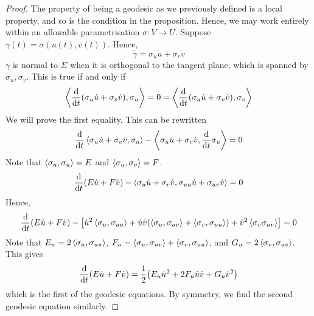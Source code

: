 \documentclass[a4paper]{article}
\begin{document}
\begin{proof}
	The property of being a geodesic as we previously defined is a local property, and so is the condition in the proposition.
	Hence, we may work entirely within an allowable parametrisation \( \sigma \colon V \to U \).
	Suppose \( \gamma(t) = \sigma(u(t), v(t)) \).
	Hence,
	\[
		\dot \gamma = \sigma_u \dot u + \sigma_v \dot v
	\]
	\( \ddot \gamma \) is normal to \( \Sigma \) when it is orthogonal to the tangent plane, which is spanned by \( \sigma_u, \sigma_v \).
	This is true if and only if
	\[
		\left\langle{ \dv{t} \qty(\sigma_u \dot u + \sigma_v \dot v), \sigma_u }\right\rangle = 0 = \left\langle{ \dv{t} \qty(\sigma_u \dot u + \sigma_v \dot v), \sigma_v }\right\rangle
	\]
	We will prove the first equality.
	This can be rewritten
	\[
		\dv{t} \left\langle{\sigma_u \dot u + \sigma_v \dot v, \sigma_u}\right\rangle - \left\langle{\sigma_u \dot u + \sigma_v \dot v, \dv{t} \sigma_u}\right\rangle = 0
	\]
	Note that \( \left\langle{\sigma_u, \sigma_u}\right\rangle = E \) and \( \left\langle{\sigma_u, \sigma_v}\right\rangle = F \).
	\[
		\dv{t} (E \dot u + F \dot v) - \left\langle{\sigma_u \dot u + \sigma_v \dot v, \sigma_{uu} \dot u + \sigma_{uv} \dot v}\right\rangle = 0
	\]
	Hence,
	\[
		\dv{t} (E \dot u + F \dot v) - \qty[ \dot u^2 \left\langle{\sigma_u, \sigma_{uu}}\right\rangle + \dot u \dot v \qty(\left\langle{\sigma_u, \sigma_{uv}}\right\rangle + \left\langle{\sigma_v, \sigma_{uu}}\right\rangle) + \dot v^2 \left\langle{\sigma_v \sigma_{uv}}\right\rangle ] = 0
	\]
	Note that \( E_u = 2 \left\langle{\sigma_u, \sigma_{uu}}\right\rangle \), \( F_u = \left\langle{\sigma_u, \sigma_{uv}}\right\rangle + \left\langle{\sigma_v, \sigma_{uu}}\right\rangle \), and \( G_u = 2\left\langle{\sigma_v, \sigma_{uv}}\right\rangle \).
	This gives
	\[
		\dv{t} (E \dot u + F \dot v) = \frac{1}{2} \qty(E_u \dot u^2 + 2 F_u \dot u \dot v + G_u \dot v^2)
	\]
	which is the first of the geodesic equations.
	By symmetry, we find the second geodesic equation similarly.
\end{proof}
\end{document}
